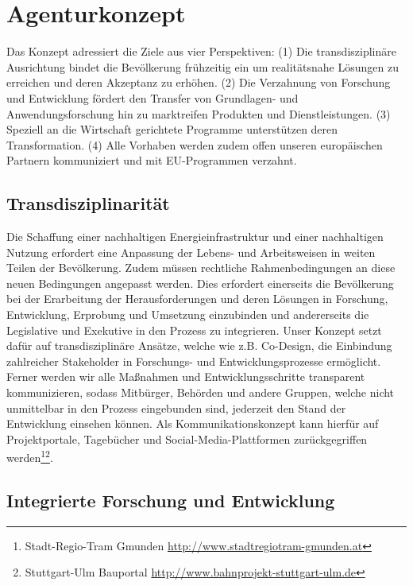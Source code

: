 \section{Agenturkonzept}

Das Konzept adressiert die Ziele aus vier Perspektiven:
(1) Die transdisziplinäre Ausrichtung bindet die Bevölkerung frühzeitig ein um realitätsnahe Lösungen zu erreichen und deren Akzeptanz zu erhöhen.
(2) Die Verzahnung von Forschung und Entwicklung fördert den Transfer von Grundlagen- und Anwendungsforschung hin zu marktreifen Produkten und Dienstleistungen.
(3) Speziell an die Wirtschaft gerichtete Programme unterstützen deren Transformation.
(4) Alle Vorhaben werden zudem offen unseren europäischen Partnern kommuniziert und mit EU-Programmen verzahnt. 

\subsection{Transdisziplinarität}

Die Schaffung einer nachhaltigen Energieinfrastruktur und einer nachhaltigen Nutzung erfordert eine Anpassung der Lebens- und Arbeitsweisen in weiten Teilen der Bevölkerung.
Zudem müssen rechtliche Rahmenbedingungen an diese neuen Bedingungen angepasst werden.
Dies erfordert einerseits die Bevölkerung bei der Erarbeitung der Herausforderungen und deren Lösungen in Forschung, Entwicklung, Erprobung und Umsetzung einzubinden und andererseits die Legislative und Exekutive in den Prozess zu integrieren.
Unser Konzept setzt dafür auf transdisziplinäre Ansätze, welche wie z.B. Co-Design, die Einbindung zahlreicher Stakeholder in Forschungs- und Entwicklungsprozesse ermöglicht.
Ferner werden wir alle Maßnahmen und Entwicklungsschritte transparent kommunizieren, sodass Mitbürger, Behörden und andere Gruppen, welche nicht unmittelbar in den Prozess eingebunden sind, jederzeit den Stand der Entwicklung einsehen können.
Als Kommunikationskonzept kann hierfür auf Projektportale, Tagebücher und Social-Media-Plattformen zurückgegriffen werden\footnote{Stadt-Regio-Tram Gmunden \url{http://www.stadtregiotram-gmunden.at}}\footnote{Stuttgart-Ulm Bauportal \url{http://www.bahnprojekt-stuttgart-ulm.de}}.


\subsection{Integrierte Forschung und Entwicklung}

